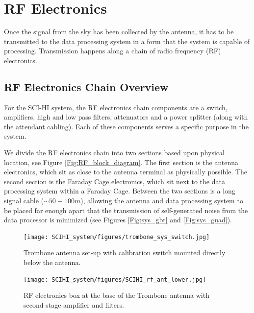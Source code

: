 \section{RF Electronics}

Once the signal from the sky has been collected by the antenna, it has to be transmitted to the data processing system in a form that the system is capable of processing. Transmission happens along a chain of radio frequency (RF) electronics. 


\subsection{RF Electronics Chain Overview}

For the SCI-HI system, the RF electronics chain components are a switch, amplifiers, high and low pass filters, attenuators and a power splitter (along with the attendant cabling). Each of these components serves a specific purpose in the system. 

We divide the RF electronics chain into two sections based upon physical location, see Figure \ref{Fig:RF_block_diagram}. The first section is the antenna electronics, which sit as close to the antenna terminal as physically possible. The second section is the Faraday Cage electronics, which sit next to the data processing system within a Faraday Cage. Between the two sections is a long signal cable ($\sim50-100 m$), allowing the antenna and data processing system to be placed far enough apart that the transmission of self-generated noise from the data processor is minimized (see Figures \ref{Fig:sys_gbt} and \ref{Fig:sys_guad}).

\begin{figure}[htb]
\centering
\begin{minipage}[b]{0.47\textwidth}
\centering
\texttt{[image: SCIHI\_system/figures/trombone\_sys\_switch.jpg]}
\caption{Trombone antenna set-up with calibration switch mounted directly below the antenna.}
\label{Fig:trombone_switch}
\end{minipage}%
\begin{minipage}[b]{0.02\textwidth}
\hspace{1cm}
\end{minipage}%
\begin{minipage}[b]{0.47\textwidth}
\centering
\texttt{[image: SCIHI\_system/figures/SCIHI\_rf\_ant\_lower.jpg]}
\caption{RF electronics box at the base of the Trombone antenna with second stage amplifier and filters.}
\label{Fig:trombone_base}
\end{minipage}
\end{figure}

